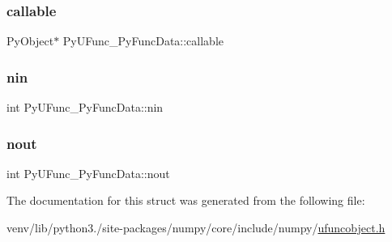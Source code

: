\subsubsection{\texorpdfstring{callable}{callable}}
{\footnotesize\ttfamily Py\+Object$\ast$ Py\+U\+Func\+\_\+\+Py\+Func\+Data\+::callable}

\mbox{\label{structPyUFunc__PyFuncData_a0cd94ed840dcbbcffe4c2de373f5602b}} 
\subsubsection{\texorpdfstring{nin}{nin}}
{\footnotesize\ttfamily int Py\+U\+Func\+\_\+\+Py\+Func\+Data\+::nin}

\mbox{\label{structPyUFunc__PyFuncData_abfd42839e23c29c59747c0a6fb9a0b0b}} 
\subsubsection{\texorpdfstring{nout}{nout}}
{\footnotesize\ttfamily int Py\+U\+Func\+\_\+\+Py\+Func\+Data\+::nout}



The documentation for this struct was generated from the following file\+:\begin{DoxyCompactItemize}
\item 
venv/lib/python3./site-\/packages/numpy/core/include/numpy/\hyperlink{ufuncobject_8h}{ufuncobject.\+h}\end{DoxyCompactItemize}
